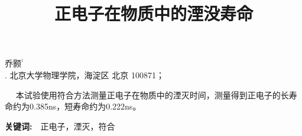 \documentclass[a4paper,10.0pt,twoside]{npr}
\begin{document}
\setcounter{page}{001}%
\begin{center}
\title{%
\xiaoerhao \bf  %
正电子在物质中的湮没寿命\\[-5mm]}
\maketitle
\large \fs
乔颢$^{^1}$\\[2mm]

\xiaowu {}. 北京大学物理学院，海淀区 北京 100871；\\[4mm]

 

\parbox{158mm} {
~~\fs
本试验使用符合方法测量正电子在物质中的湮灭时间，测量得到正电子的长寿命约为0.385ns，短寿命约为0.222ns。

{\bf 关键词:}~~\fs 正电子，湮灭，符合}\\
\end{center}
\vspace{5mm}
\setcounter{section}{0}
\end{document}
